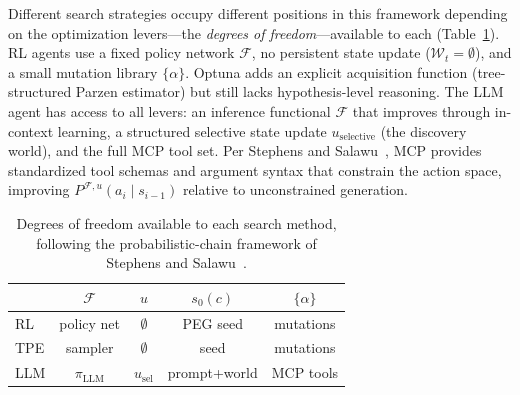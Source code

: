 \documentclass[twocolumn]{fairmeta}
\begin{document}
Different search strategies occupy different positions in this framework depending on the optimization levers---the \emph{degrees of freedom}---available to each (Table~\ref{tab:dof}).
RL agents use a fixed policy network $\mathcal{F}$, no persistent state update ($\mathcal{W}_t = \emptyset$), and a small mutation library $\{\alpha\}$.
Optuna adds an explicit acquisition function (tree-structured Parzen estimator) but still lacks hypothesis-level reasoning.
The LLM agent has access to all levers: an inference functional $\mathcal{F}$ that improves through in-context learning, a structured selective state update $u_\text{selective}$ (the discovery world), and the full MCP tool set.
Per Stephens and Salawu~\cite{stephens2025mathframing}, MCP provides standardized tool schemas and argument syntax that constrain the action space, improving $P^{\mathcal{F},u}(a_i \mid s_{i-1})$ relative to unconstrained generation.

\begin{table}[t]
\centering
\caption{Degrees of freedom available to each search method, following the probabilistic-chain framework of Stephens and Salawu~\cite{stephens2025mathframing}.}
\label{tab:dof}
\small
\begin{tabular}{lcccc}
\toprule
 & $\mathcal{F}$ & $u$ & $s_0(c)$ & $\{\alpha\}$ \\
\midrule
RL    & policy net & $\emptyset$ & PEG seed  & mutations \\
TPE   & sampler   & $\emptyset$ & seed      & mutations \\
LLM   & $\pi_\text{LLM}$ & $u_\text{sel}$ & prompt+world & MCP tools \\
\bottomrule
\end{tabular}
\end{table}
\end{document}

